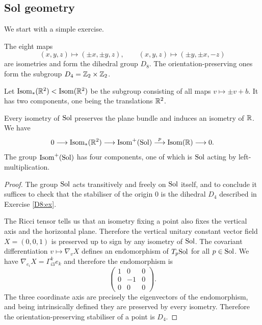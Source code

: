 \subsection{Sol geometry}
We start with a simple exercise.
\begin{ex} \label{D8:ex}
The eight maps 
$$(x,y,z) \mapsto (\pm x, \pm y,z), \qquad (x,y,z) \mapsto (\pm y, \pm x, -z)$$
are isometries and form the dihedral group $D_8$. The orientation-preserving ones form the subgroup $D_4 = \mathbb{Z}_2 \times \mathbb{Z}_2$.
\end{ex}
Let ${\rm Isom}_*(\mathbb{R}^2) < {\rm Isom}(\mathbb{R}^2)$ be the subgroup consisting of all maps $v\mapsto \pm v +b$. It has two components, one being the translations $\mathbb{R}^2$.
\begin{prop}
Every isometry of ${\rm Sol}$ preserves the plane bundle and induces an isometry of $\mathbb{R}$. We have
$$0 \longrightarrow {\rm Isom}_*(\mathbb{R}^2) \longrightarrow {\rm Isom}^+({\rm Sol}) \stackrel p \longrightarrow {\rm Isom}(\mathbb{R}) \longrightarrow 0.$$
The group ${\rm Isom}^+({\rm Sol})$ has four components, one of which is ${\rm Sol}$ acting by left-multiplication. 
\end{prop}
\begin{proof}
The group ${\rm Sol}$ acts transitively and freely on ${\rm Sol}$ itself, and to conclude it suffices to check that the stabiliser of the origin $0$ is the dihedral $D_4$ described in Exercise \ref{D8:ex}. 

The Ricci tensor tells us that an isometry fixing a point also fixes the vertical axis and the horizontal plane. Therefore the vertical unitary constant vector field $X=(0,0,1)$ is preserved up to sign by any isometry of ${\rm Sol}$. The covariant differentiation $v \mapsto \nabla_v X$ defines an endomorphism of $T_p {\rm Sol}$ for all $p \in {\rm Sol}$. We have $\nabla_{e_i} X = \Gamma_{i3}^ke_k$ and therefore the endomorphism is
$$\begin{pmatrix}
1 & 0 & 0 \\
0 & -1 & 0 \\
0 & 0 & 0 
\end{pmatrix}.
$$
The three coordinate axis are precisely the eigenvectors of the endomorphism, and being intrinsically defined they are preserved by every isometry. Therefore the orientation-preserving stabiliser of a point is $D_4$.
\end{proof}


